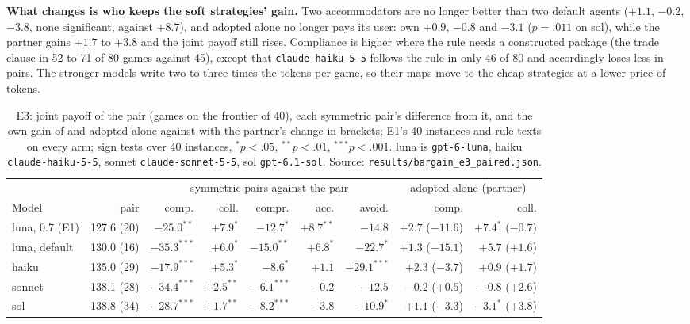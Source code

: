 \textbf{What changes is who keeps the soft strategies' gain.} Two accommodators are no longer better than two default agents ($+1.1$, $-0.2$, $-3.8$, none significant, against $+8.7$), and \collaborating{} adopted alone no longer pays its user: own $+0.9$, $-0.8$ and $-3.1$ ($p = .011$ on sol), while the partner gains $+1.7$ to $+3.8$ and the joint payoff still rises. Compliance is higher where the rule needs a constructed package (the \collaborating{} trade clause in 52 to 71 of 80 games against 45), except that \texttt{claude-haiku-5-5} follows the \competing{} rule in only 46 of 80 and accordingly loses less in \competing{} pairs. The stronger models write two to three times the tokens per game, so their maps move to the cheap strategies at a lower price of tokens.

\begin{table}[t]
\caption{E3: joint payoff of the \neutral{} pair (games on the frontier of 40), each symmetric pair's difference from it, and the own gain of \competing{} and \collaborating{} adopted alone against \neutral{} with the partner's change in brackets; E1's 40 instances and rule texts on every arm; sign tests over 40 instances, $^{*}p<.05$, $^{**}p<.01$, $^{***}p<.001$. luna is \texttt{gpt-6-luna}, haiku \texttt{claude-haiku-5-5}, sonnet \texttt{claude-sonnet-5-5}, sol \texttt{gpt-6.1-sol}. Source: \texttt{results/bargain\_e3\_paired.json}.}
\label{tab:e3}
\centering\footnotesize\setlength{\tabcolsep}{3pt}
\begin{tabular}{@{}l r rrrrr rr@{}}
\toprule
 & & \multicolumn{5}{c}{symmetric pairs against the \neutral{} pair} & \multicolumn{2}{c}{adopted alone (partner)} \\
\cmidrule(lr){3-7}\cmidrule(lr){8-9}
Model & \neutral{} pair & comp. & coll. & compr. & acc. & avoid. & comp. & coll. \\
\midrule
luna, 0.7 (E1)   & 127.6 (20) & $-25.0^{**}$ & $+7.9^{*}$ & $-12.7^{*}$ & $+8.7^{**}$ & $-14.8$ & $+2.7$ ($-11.6$) & $+7.4^{*}$ ($-0.7$) \\
luna, default    & 130.0 (16) & $-35.3^{***}$ & $+6.0^{*}$ & $-15.0^{**}$ & $+6.8^{*}$ & $-22.7^{*}$ & $+1.3$ ($-15.1$) & $+5.7$ ($+1.6$) \\
haiku            & 135.0 (29) & $-17.9^{***}$ & $+5.3^{*}$ & $-8.6^{*}$ & $+1.1$ & $-29.1^{***}$ & $+2.3$ ($-3.7$) & $+0.9$ ($+1.7$) \\
sonnet           & 138.1 (28) & $-34.4^{***}$ & $+2.5^{**}$ & $-6.1^{***}$ & $-0.2$ & $-12.5$ & $-0.2$ ($+0.5$) & $-0.8$ ($+2.6$) \\
sol              & 138.8 (34) & $-28.7^{***}$ & $+1.7^{**}$ & $-8.2^{***}$ & $-3.8$ & $-10.9^{*}$ & $+1.1$ ($-3.3$) & $-3.1^{*}$ ($+3.8$) \\
\bottomrule
\end{tabular}
\end{table}

